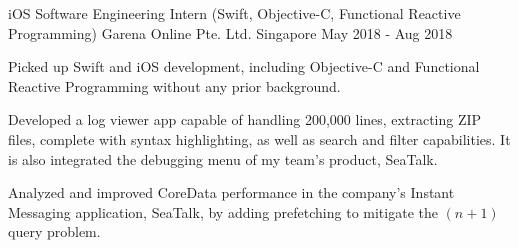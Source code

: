

\begin{cventries}


	\cventry
		{iOS Software Engineering Intern (Swift, Objective-C, Functional Reactive Programming)} %
		{Garena Online Pte. Ltd.} %
		{Singapore} %
		{May 2018 - Aug 2018} %
		{
			\begin{cvitems}
				\item {Picked up Swift and iOS development, including Objective-C and Functional Reactive Programming without any prior background.}
				\item {Developed a log viewer app capable of handling 200,000 lines, extracting ZIP files, complete with syntax highlighting, as well as search and filter capabilities. It is also integrated the debugging menu of my team's product, SeaTalk.}
				\item {Analyzed and improved CoreData performance in the company's Instant Messaging application, SeaTalk, by adding prefetching to mitigate the $(n+1)$ query problem.}
			\end{cvitems}
		}


\end{cventries}
